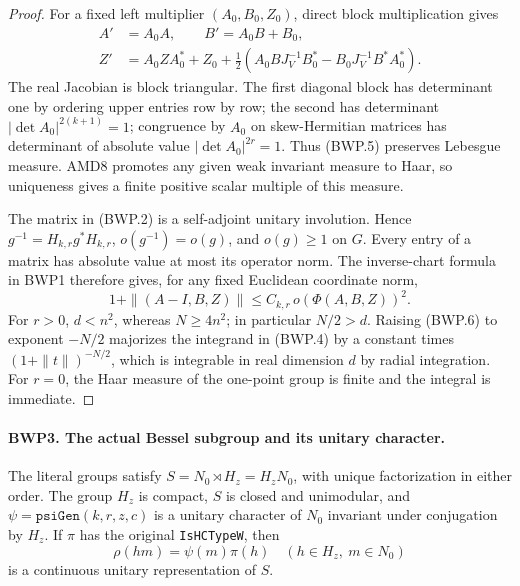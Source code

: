 \begin{proof}
For a fixed left multiplier \((A_0,B_0,Z_0)\), direct block
multiplication gives
\[
 \begin{split}
 A'&=A_0A,\qquad B'=A_0B+B_0,\\
 Z'&=A_0ZA_0^*+Z_0+
 \tfrac12(A_0BJ_V^{-1}B_0^*-B_0J_V^{-1}B^*A_0^*).
 \end{split}
 \tag{BWP.5}
\]
The real Jacobian is block triangular.  The first diagonal block
has determinant one by ordering upper entries row by row; the second
has determinant \(|\det A_0|^{2(k+1)}=1\); congruence by \(A_0\)
on skew-Hermitian matrices has determinant of absolute value
\(|\det A_0|^{2r}=1\).  Thus (BWP.5) preserves Lebesgue measure.
AMD8 promotes any given weak invariant measure to Haar, so uniqueness
gives a finite positive scalar multiple of this measure.

The matrix in (BWP.2) is a self-adjoint unitary involution.  Hence
\(g^{-1}=H_{k,r}g^*H_{k,r}\), \(o(g^{-1})=o(g)\), and
\(o(g)\ge1\) on \(G\).  Every entry of a matrix has absolute
value at most its operator norm.  The inverse-chart formula in BWP1
therefore gives, for any fixed Euclidean coordinate norm,
\[
 1+\|(A-I,B,Z)\|\le C_{k,r}\,o(\Phi(A,B,Z))^2.
 \tag{BWP.6}
\]
For \(r>0\), \(d< n^2\), whereas \(N\ge4n^2\); in
particular \(N/2>d\).  Raising (BWP.6) to exponent \(-N/2\)
majorizes the integrand in (BWP.4) by a constant times
\((1+\|t\|)^{-N/2}\), which is integrable in real dimension
\(d\) by radial integration.  For \(r=0\), the Haar measure
of the one-point group is finite and the integral is immediate.
\end{proof}

\paragraph{BWP3. The actual Bessel subgroup and its unitary character.}
\label{claim:BWP3}
The literal groups satisfy \(S=N_0\rtimes H_z=H_zN_0\), with
unique factorization in either order.  The group \(H_z\) is compact,
\(S\) is closed and unimodular, and
\(\psi=\texttt{psiGen}(k,r,z,c)\) is a unitary character of
\(N_0\) invariant under conjugation by \(H_z\).  If \(\pi\)
has the original \texttt{IsHCTypeW}, then
\[
 \rho(hm)=\psi(m)\pi(h)\quad(h\in H_z,\ m\in N_0)
 \tag{BWP.7}
\]
is a continuous unitary representation of \(S\).

